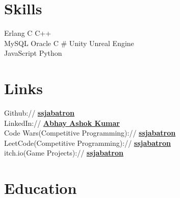\documentclass[]{deedy-resume-openfont}
\begin{document}
%
%
\lastupdated

%
%

%
%

\begin{minipage}[t]{0.28\textwidth} 


\section{Skills}
Erlang \textbullet{}   C \textbullet{} C++\\ 
MySQL \textbullet{} Oracle \textbullet{} C \# \textbullet{} Unity \textbullet{} Unreal Engine \\
 \textbullet{} JavaScript \textbullet{} Python
\sectionsep



\section{Links} 
Github:// \href{https://github.com/SSJAbatron}{\bf ssjabatron} \\
LinkedIn://  \href{https://www.linkedin.com/in/abhay-ashok-kumar-7b685bb3}{\bf Abhay Ashok Kumar} \\
Code Wars(Competitive Programming)://  \href{https://www.codewars.com/users/SSJAbatron}{\bf ssjabatron} \\
LeetCode(Competitive Programming)://  \href{https://leetcode.com/SSJAbatron/}{\bf ssjabatron} \\
itch.io(Game Projects)://  \href{https://ssjabatron.itch.io}{\bf ssjabatron}
\vspace{\topsep} %

\section{Education} 
\vspace{\topsep} %

\end{minipage}
\end{document}
